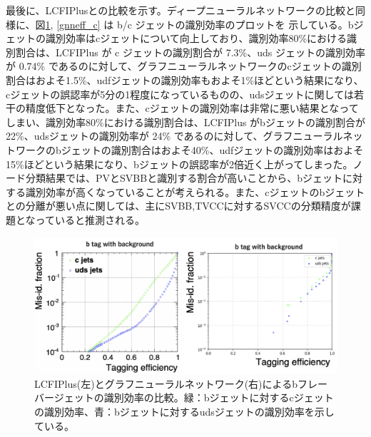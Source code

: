 最後に、LCFIPlusとの比較を示す。ディープニューラルネットワークの比較と同様に、図\ref{gnneff_b}, \ref{gnneff_c} は b/c ジェットの識別効率のプロットを
示している。bジェットの識別効率はcジェットについて向上しており、識別効率80\%における識別割合は、LCFIPlus が c ジェットの識別割合が 7.3\%、uds ジェットの識別効率が 0.74\% であるのに対して、グラフニューラルネットワークのcジェットの識別割合はおよそ1.5\%、udfジェットの識別効率もおよそ1\%ほどという結果になり、cジェットの誤認率が5分の1程度になっているものの、udsジェットに関しては若干の精度低下となった。また、cジェットの識別効率は非常に悪い結果となってしまい、識別効率80\%における識別割合は、LCFIPlus がbジェットの識別割合が 22\%、udsジェットの識別効率が 24\% であるのに対して、グラフニューラルネットワークのbジェットの識別割合はおよそ40\%、udfジェットの識別効率はおよそ15\%ほどという結果になり、bジェットの誤認率が2倍近く上がってしまった。ノード分類結果では、PVとSVBBと識別する割合が高いことから、bジェットに対する識別効率が高くなっていることが考えられる。また、cジェットのbジェットとの分離が悪い点に関しては、主にSVBB,TVCCに対するSVCCの分類精度が課題となっていると推測される。\\
\begin{figure}[H]
	\begin{center}
 \includegraphics[keepaspectratio, scale=0.3]
 	{Figure/Flavortagging/gnneff_b.png}
 		\caption{LCFIPlus(左)とグラフニューラルネットワーク(右)によるbフレーバージェットの識別効率の比較。緑：bジェットに対するcジェットの識別効率、青：bジェットに対するudsジェットの識別効率を示している。}
 		\label{gnneff_b}
	\end{center}
\end{figure}

